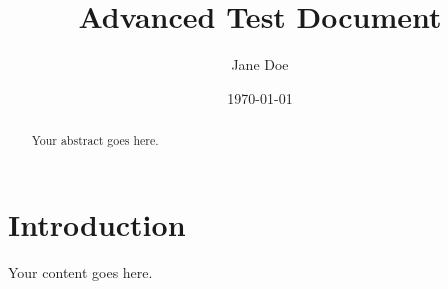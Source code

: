\documentclass{article}
\title{Advanced Test Document}
\author{Jane Doe}
\date{\today}
\begin{document}
\maketitle

\begin{abstract}
Your abstract goes here.
\end{abstract}

\section{Introduction}

Your content goes here.
\end{document}
